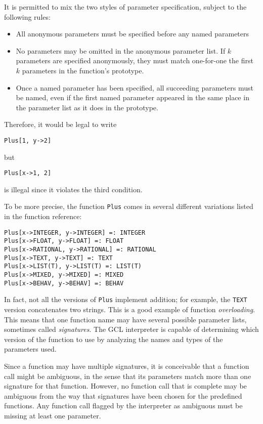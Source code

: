It is permitted to mix the two styles of parameter specification, subject
to the following rules:

\begin{itemize}
\item All anonymous parameters must be specified before any named parameters
\item No parameters may be omitted in the anonymous parameter list.  If
$k$ parameters are specified anonymously, they must match one-for-one the
first $k$ parameters in the function's prototype.
\item Once a named parameter has been specified, all succeeding parameters
must be named, even if the first named parameter appeared in the same
place in the parameter list as it does in the prototype.
\end{itemize}

\noindent Therefore, it would be legal to write

\begin{verbatim}
Plus[1, y->2]
\end{verbatim}

\noindent but

\begin{verbatim}
Plus[x->1, 2]
\end{verbatim}

\noindent is illegal since it violates the third condition.

To be more precise, the function {\tt Plus} comes in several different
variations listed in the function reference:

\begin{verbatim}
Plus[x->INTEGER, y->INTEGER] =: INTEGER
Plus[x->FLOAT, y->FLOAT] =: FLOAT
Plus[x->RATIONAL, y->RATIONAL] =: RATIONAL
Plus[x->TEXT, y->TEXT] =: TEXT
Plus[x->LIST(T), y->LIST(T) =: LIST(T)
Plus[x->MIXED, y->MIXED] =: MIXED
Plus[x->BEHAV, y->BEHAV] =: BEHAV
\end{verbatim}

\noindent In fact, not all the versions of {\tt Plus} implement addition;
for example, the {\tt TEXT} version concatenates two strings.  This is a
good example of function {\it overloading}.  This means that one function
name may have several possible parameter lists, sometimes called
{\it signatures}.  The GCL interpreter is capable of determining which
version of the function to use by analyzing the names and types of the
parameters used.

Since a function may have multiple signatures, it is conceivable that
a function call might be ambiguous, in the sense that its parameters match
more than one signature for that function.  However, no function call that
is complete may be ambiguous from the way that signatures have been
chosen for the predefined functions.  Any function call flagged by the
interpreter as ambiguous must be missing at least one parameter.

